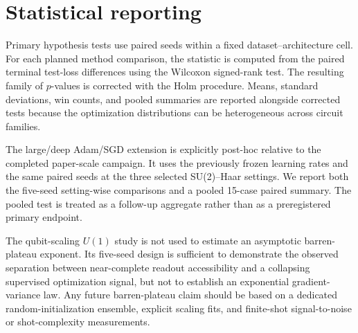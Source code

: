 \section{Statistical reporting}

Primary hypothesis tests use paired seeds within a fixed dataset--architecture cell. For each planned method comparison, the statistic is computed from the paired terminal test-loss differences using the Wilcoxon signed-rank test. The resulting family of $p$-values is corrected with the Holm procedure. Means, standard deviations, win counts, and pooled summaries are reported alongside corrected tests because the optimization distributions can be heterogeneous across circuit families.

The large/deep Adam/SGD extension is explicitly post-hoc relative to the completed paper-scale campaign. It uses the previously frozen learning rates and the same paired seeds at the three selected SU(2)--Haar settings. We report both the five-seed setting-wise comparisons and a pooled 15-case paired summary. The pooled test is treated as a follow-up aggregate rather than as a preregistered primary endpoint.

The qubit-scaling $U(1)$ study is not used to estimate an asymptotic barren-plateau exponent. Its five-seed design is sufficient to demonstrate the observed separation between near-complete readout accessibility and a collapsing supervised optimization signal, but not to establish an exponential gradient-variance law. Any future barren-plateau claim should be based on a dedicated random-initialization ensemble, explicit scaling fits, and finite-shot signal-to-noise or shot-complexity measurements.

